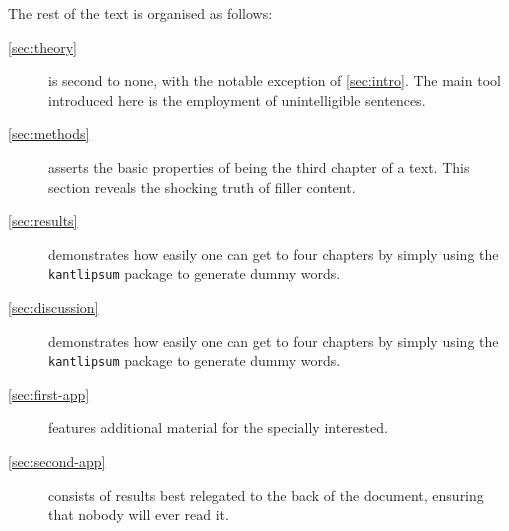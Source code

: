 The rest of the text is organised as follows:
\begin{description}
    \item[\cref{sec:theory}]
    is second to none, with the notable exception of \cref{sec:intro}.
    The main tool introduced here is the employment of unintelligible sentences.

    \item[\cref{sec:methods}]
    asserts the basic properties of being the third chapter of a text.
    This section reveals the shocking truth of filler content.

    \item[\cref{sec:results}]
    demonstrates how easily one can get to four chapters by simply using the \texttt{kantlipsum} package to generate dummy words.
    
    \item[\cref{sec:discussion}]
    demonstrates how easily one can get to four chapters by simply using the \texttt{kantlipsum} package to generate dummy words.

    \item[\cref{sec:first-app}]
    features additional material for the specially interested.

    \item[\cref{sec:second-app}]
    consists of results best relegated to the back of the document,
    ensuring that nobody will ever read it.
\end{description}